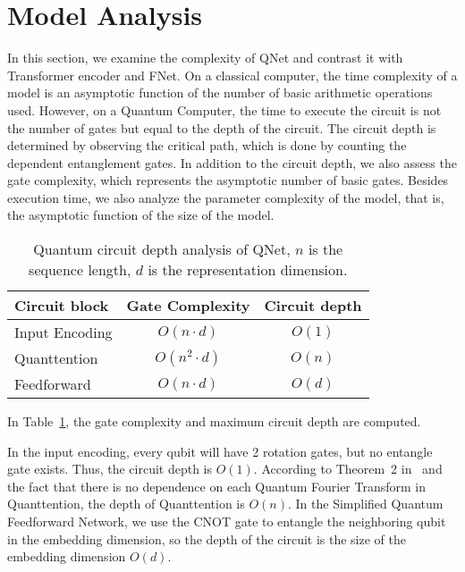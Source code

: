 \section{Model Analysis}

In this section, we examine the complexity of QNet and contrast it with Transformer encoder and FNet. On a classical computer, the time complexity of a model is an asymptotic function of the number of basic arithmetic operations used. However, on a Quantum Computer, the time to execute the circuit is not the number of gates but equal to the depth of the circuit. The circuit depth is determined by observing the critical path, which is done by counting the dependent entanglement gates. In addition to the circuit depth, we also assess the gate complexity, which represents the asymptotic number of basic gates.
Besides execution time, we also analyze the parameter complexity of the model, that is, the asymptotic function of the size of the model.

\begin{table}[htb!]
    \centering
    \begin{tabular}{ l|c|c  }
        \hline
        Circuit block & Gate Complexity & Circuit depth \\
        \hline
        Input Encoding & $O(n \cdot d)$ & $O(1)$ \\
        Quanttention &  $O(n^2 \cdot d)$ & $O(n)$ \\
        Feedforward &  $O(n \cdot d)$ & $O(d)$ \\
        \hline
    \end{tabular}
    \caption{Quantum circuit depth analysis of QNet, $n$ is the sequence length, $d$ is the representation dimension.}
    \label{table:depth}
\end{table}

In Table~\ref{table:depth}, the gate complexity and maximum circuit depth are computed.

In the input encoding, every qubit will have 2 rotation gates, but no entangle gate exists. Thus, the circuit depth is $O(1)$.
According to Theorem~2 in~\cite{892140} and the fact that there is no dependence on each Quantum Fourier Transform in Quanttention, the depth of Quanttention is $O(n)$.
In the Simplified Quantum Feedforward Network, we use the CNOT gate to entangle the neighboring qubit in the embedding dimension, so the depth of the circuit is the size of the embedding dimension $O(d)$.

